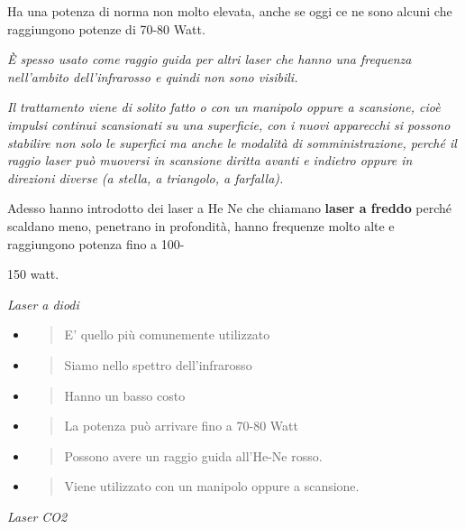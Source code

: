 \documentclass[]{article}
\begin{document}
Ha una potenza di norma non molto elevata, anche se oggi ce ne sono
alcuni che raggiungono potenze di 70-80 Watt.

\emph{È spesso usato come raggio guida per altri laser che hanno una
frequenza nell'ambito dell'infrarosso e quindi non sono visibili. }

\emph{Il trattamento viene di solito fatto o con un manipolo oppure a
scansione, cioè impulsi continui scansionati su una superficie, con i
nuovi apparecchi si possono stabilire non solo le superfici ma anche le
modalità di somministrazione, perché il raggio laser può muoversi in
scansione diritta avanti e indietro oppure in direzioni diverse (a
stella, a triangolo, a farfalla).}

Adesso hanno introdotto dei laser a He Ne che chiamano \textbf{laser a
freddo} perché scaldano meno, penetrano in profondità, hanno frequenze
molto alte e raggiungono potenza fino a 100-

150 watt.

\emph{Laser a diodi }

\begin{itemize}
\item
  \begin{quote}
  E' quello più comunemente utilizzato
  \end{quote}
\item
  \begin{quote}
  Siamo nello spettro dell'infrarosso
  \end{quote}
\item
  \begin{quote}
  Hanno un basso costo
  \end{quote}
\item
  \begin{quote}
  La potenza può arrivare fino a 70-80 Watt
  \end{quote}
\item
  \begin{quote}
  Possono avere un raggio guida all'He-Ne rosso.
  \end{quote}
\item
  \begin{quote}
  Viene utilizzato con un manipolo oppure a scansione.
  \end{quote}
\end{itemize}

\emph{Laser CO2}
\end{document}
